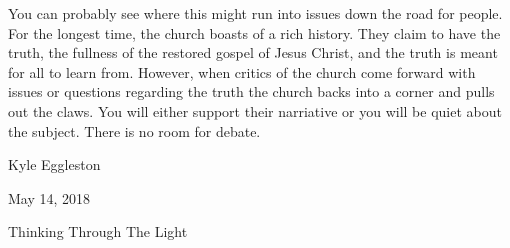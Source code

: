 You can probably see where this might run into issues down the road for people.
For the longest time, the church boasts of a rich history. They claim to
have the truth, the fullness of the restored gospel of Jesus Christ, 
and the truth is meant for all to learn from. However, when critics of the 
church come forward with issues or questions regarding the truth the church 
backs into a corner and pulls out the claws. You will either support their 
narriative or you will be quiet about the subject. There is no room for debate.

\begin{flushright}
Kyle Eggleston

May 14, 2018

Thinking Through The Light
\end{flushright}
